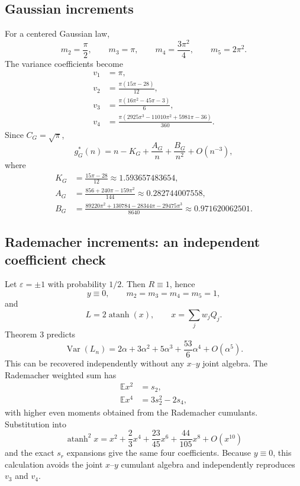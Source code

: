 \documentclass[11pt]{article}
\newcommand{\E}{\mathbb E}
\newcommand{\Var}{\operatorname{Var}}
\newcommand{\atanh}{\operatorname{atanh}}
\begin{document}
\subsection{Gaussian increments}
For a centered Gaussian law,
\begin{equation}
m_2=\frac\pi2,\qquad m_3=\pi,
\qquad m_4=\frac{3\pi^2}{4},\qquad m_5=2\pi^2.
\end{equation}
The variance coefficients become
\begin{align}
v_1&=\pi,\\
v_2&=\frac{\pi(15\pi-28)}{12},\\
v_3&=\frac{\pi(16\pi^2-45\pi-3)}{6},\\
v_4&=\frac{\pi(2925\pi^3-11010\pi^2+5981\pi-36)}{360}.
\end{align}
Since $C_G=\sqrt\pi$,
\begin{equation}
\boxed{
g_G^*(n)=n-K_G+\frac{A_G}{n}+\frac{B_G}{n^2}+O(n^{-3}),}
\end{equation}
where
\begin{align}
K_G&=\frac{15\pi-28}{12}\approx1.593657483654,\\
A_G&=\frac{856+240\pi-159\pi^2}{144}\approx0.282744007558,\\
B_G&=\frac{89220\pi^2+130784-28344\pi-29475\pi^3}{8640}
\approx0.971620062501.
\end{align}

\subsection{Rademacher increments: an independent coefficient check}
Let $\varepsilon=\pm1$ with probability $1/2$. Then $R\equiv1$, hence
\begin{equation}
y\equiv0,\qquad m_2=m_3=m_4=m_5=1,
\end{equation}
and
\begin{equation}
L=2\atanh(x),\qquad x=\sum_jw_jQ_j.
\end{equation}
Theorem 3 predicts
\begin{equation}
\boxed{
\Var(L_n)=2\alpha+3\alpha^2+5\alpha^3+\frac{53}{6}\alpha^4+O(\alpha^5).}
\end{equation}
This can be recovered independently without any $x$--$y$ joint algebra. The Rademacher weighted sum has
\begin{align}
\E x^2&=s_2,\\
\E x^4&=3s_2^2-2s_4,
\end{align}
with higher even moments obtained from the Rademacher cumulants. Substitution into
\begin{equation}
\atanh^2x=x^2+\frac23x^4+\frac{23}{45}x^6+\frac{44}{105}x^8+O(x^{10})
\end{equation}
and the exact $s_r$ expansions give the same four coefficients.  Because
$y\equiv0$, this calculation avoids the joint $x$--$y$ cumulant algebra and
independently reproduces $v_3$ and $v_4$.
\end{document}
